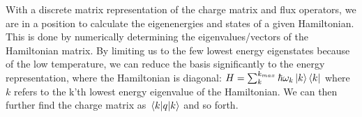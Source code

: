 With a discrete matrix representation of the charge matrix and flux operators, we are in a position to calculate the eigenenergies and states of a given Hamiltonian. This is done by numerically determining the eigenvalues/vectors of the Hamiltonian matrix. By limiting us to the few lowest energy eigenstates because of the low temperature, we can reduce the basis significantly to the energy representation, where the Hamiltonian is diagonal: $H = \sum_k^{k_{max}} \hbar \omega_k \ket{k}\bra{k}$ where $k$ refers to the k'th lowest energy eigenvalue of the Hamiltonian. We can then further find the charge matrix as $\mel{k}{q}{k}$ and so forth.














